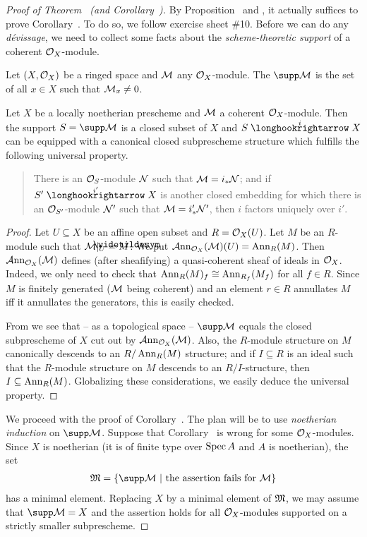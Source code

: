 \documentclass[a4paper,parskip=half,numbers=enddot, DIV=12]{scrreprt}
\begin{document}
\begin{proof}[Proof of Theorem~ (and Corollary~)]
	By Proposition~ and , it actually suffices to prove Corollary~. To do so, we follow exercise sheet \#10. Before we can do any \emph{dévissage}, we need to collect some facts about the \emph{scheme-theoretic support} of a coherent $\mathcal{O}_X$-module.
	\begin{defi}
		Let $(X,\mathcal{O}_X)$ be a ringed space and $\mathcal{M}$ any $\mathcal{O}_X$-module. The  $\supp\Mm$ is the set of all $x\in X$ such that $\mathcal{M}_x\neq 0$.
	\end{defi}
	\begin{lem}
		Let $X$ be a locally noetherian prescheme and $\mathcal{M}$ a coherent $\mathcal{O}_X$-module. Then the support $S=\supp\Mm$ is a closed subset of $X$ and $S\monomorphism[i]X$ can be equipped with a canonical closed subprescheme structure which fulfills the following universal property.
		\begin{quote}
			There is an $\mathcal{O}_S$-module $\mathcal{N}$ such that $\mathcal{M}=i_*\mathcal{N}$; and if $S'\monomorphism[i']X$ is another closed embedding for which there is an $\mathcal{O}_{S'}$-module $\mathcal{N}'$ such that $\mathcal{M}=i_*'\mathcal{N}'$, then $i$ factors uniquely over $i'$.
		\end{quote}	 
	\end{lem}
	\begin{proof}
		Let $U\subseteq X$ be an affine open subset and $R=\mathcal{O}_X(U)$. Let $M$ be an $R$-module such that $\Mm|_U=\snake{M}$. We put $\operatorname{\mathcal{A} nn}_{\mathcal{O}_X}(\mathcal{M})(U)=\operatorname{Ann}_R(M)$. Then $\operatorname{\mathcal{A} nn}_{\mathcal{O}_X}(\mathcal{M})$ defines (after sheafifying) a quasi-coherent sheaf of ideals in $\mathcal{O}_X$. Indeed, we only need to check that $\operatorname{Ann}_R(M)_f\cong\operatorname{Ann}_{R_f}(M_f)$ for all $f\in R$. Since $M$ is finitely generated ($\mathcal{M}$ being coherent) and an element $r\in R$ annullates $M$ iff it annullates the generators, this is easily checked.
		
		From \cite[Lemma~3.4.1]{alg2} we see that -- as a topological space -- $\supp \Mm$ equals the closed subprescheme of $X$ cut out by $\operatorname{\mathcal{A} nn}_{\mathcal{O}_X}(\mathcal{M})$. Also, the $R$-module structure on $M$ canonically descends to an $R/\operatorname{Ann}_R(M)$ structure; and if $I\subseteq R$ is an ideal such that the $R$-module structure on $M$ descends to an $R/I$-structure, then $I\subseteq \operatorname{Ann}_R(M)$. Globalizing these considerations, we easily deduce the universal property.
	\end{proof}
	We proceed with the proof of Corollary~. The plan will be to use \emph{noetherian induction} on $\supp\Mm$. Suppose that Corollary~ is wrong for some $\mathcal{O}_X$-modules. Since $X$ is noetherian (it is of finite type over $\operatorname{Spec} A$ and $A$ is noetherian), the set
	\begin{align*}
		\MM=\left\{\supp\Mm\st\text{the assertion fails for }\Mm\right\}
	\end{align*}
	has a minimal element. Replacing $X$ by a minimal element of $\mathfrak{M}$, we may assume that $\supp\Mm=X$ and the assertion holds for all $\mathcal{O}_X$-modules supported on a strictly smaller subprescheme.
	

\end{proof}
\end{document}
